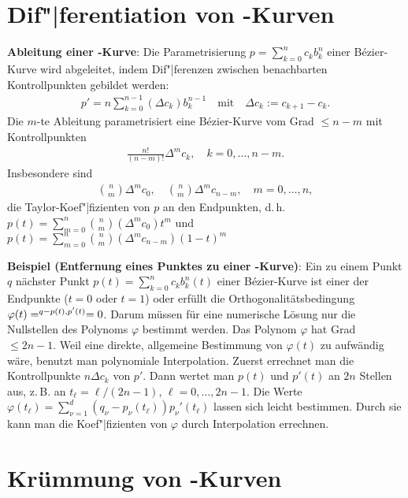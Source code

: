 \section{%
    Dif"|ferentiation von -Kurven%
}

\textbf{Ableitung einer -Kurve}:
Die Parametrisierung $p = \sum_{k=0}^n c_k b_k^n$ einer Bézier-Kurve wird abgeleitet, indem
Dif"|ferenzen zwischen benachbarten Kontrollpunkten gebildet werden:
\begin{align*}
    p' = n \sum_{k=0}^{n-1} (\Delta c_k) b_k^{n-1}\quad\text{mit}\quad
    \Delta c_k := c_{k+1} - c_k.
\end{align*}
Die $m$-te Ableitung parametrisiert eine Bézier-Kurve vom Grad $\le n - m$ mit Kontrollpunkten
\begin{align*}
    \frac{n!}{(n - m)!} \Delta^m c_k,\quad
    k = 0, \dotsc, n - m.
\end{align*}
Insbesondere sind
\begin{align*}
    \binom{n}{m} \Delta^m c_0,\quad
    \binom{n}{m} \Delta^m c_{n-m},\quad
    m = 0, \dotsc, n,
\end{align*}
die Taylor-Koef"|fizienten von $p$ an den Endpunkten, d.\,h.
$p(t) = \sum_{m=0}^n \binom{n}{m} (\Delta^m c_0) t^m$ und\\
$p(t) = \sum_{m=0}^n \binom{n}{m} (\Delta^m c_{n-m}) (1 - t)^m$

\linie

\textbf{Beispiel (Entfernung eines Punktes zu einer -Kurve)}:
Ein zu einem Punkt $q$ nächster Punkt $p(t) = \sum_{k=0}^n c_k b_k^n(t)$ einer Bézier-Kurve ist
einer der Endpunkte ($t = 0$ oder $t = 1$) oder erfüllt die Orthogonalitätsbedingung
$\varphi(t) = \sp{q - p(t), p'(t)} = 0$.
Darum müssen für eine numerische Lösung nur die Nullstellen des Polynoms $\varphi$
bestimmt werden.
Das Polynom $\varphi$ hat Grad $\le 2n - 1$.
Weil eine direkte, allgemeine Bestimmung von $\varphi(t)$ zu aufwändig wäre,
benutzt man polynomiale Interpolation.
Zuerst errechnet man die Kontrollpunkte $n \Delta c_k$ von $p'$.
Dann wertet man $p(t)$ und $p'(t)$ an $2n$ Stellen aus, z.\,B. an $t_\ell = \ell/(2n - 1)$,
$\ell = 0, \dotsc, 2n - 1$.
Die Werte $\varphi(t_\ell) = \sum_{\nu=1}^d (q_\nu - p_\nu(t_\ell)) p_\nu'(t_\ell)$
lassen sich leicht bestimmen.
Durch sie kann man die Koef"|fizienten von $\varphi$ durch Interpolation errechnen.

\section{%
    Krümmung von -Kurven%
}

